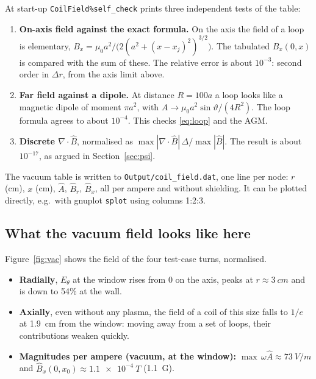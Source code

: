 \documentclass[11pt,a4paper]{article}
\newcommand{\Ahat}{\hat{A}}
\newcommand{\Bhat}{\hat{B}}
\newcommand{\code}[1]{\texttt{#1}}
\begin{document}
At start-up \code{CoilField\%self\_check} prints three independent tests of
the table:
\begin{enumerate}
  \item \textbf{On-axis field against the exact formula.} On the axis the
        field of a loop is elementary,
        $B_x = \mu_0 a^2 / \big(2(a^2+(x-x_j)^2)^{3/2}\big)$. The tabulated
        $\Bhat_x(0,x)$ is compared with the sum of these. The relative
        error is about $10^{-3}$: second order in $\Delta r$, from the axis
        limit above.
  \item \textbf{Far field against a dipole.} At distance $R = 100a$ a loop
        looks like a magnetic dipole of moment $\pi a^2$, with
        $A \to \mu_0 a^2\sin\vartheta/(4R^2)$. The loop formula agrees to
        about $10^{-4}$. This checks \eqref{eq:loop} and the AGM.
  \item \textbf{Discrete $\nabla\cdot\Bhat$}, normalised as
        $\max|\nabla\cdot\Bhat|\,\Delta/\max|\Bhat|$. The result is about
        $10^{-17}$, as argued in Section~\ref{sec:psi}.
\end{enumerate}
The vacuum table is written to \code{Output/coil\_field.dat}, one line per
node: $r$ (cm), $x$ (cm), $\Ahat$, $\Bhat_r$, $\Bhat_x$, all per ampere and
without shielding. It can be plotted directly, e.g.\ with gnuplot
\code{splot} using columns 1:2:3.

\subsection{What the vacuum field looks like here}

Figure~\ref{fig:vac} shows the field of the four test-case turns,
normalised.
\begin{itemize}
  \item \textbf{Radially}, $E_\theta$ at the window rises from 0 on the
        axis, peaks at $r\approx\SI{3}{cm}$ and is down to 54\% at the wall.
  \item \textbf{Axially}, even without any plasma, the field of a coil of
        this size falls to $1/e$ at \SI{1.9}{cm} from the window: moving
        away from a set of loops, their contributions weaken quickly.
  \item \textbf{Magnitudes per ampere (vacuum, at the window):}
        $\max\,\omega\Ahat \approx \SI{73}{V/m}$ and
        $\Bhat_x(0,x_0) \approx \SI{1.1e-4}{T}$ (\SI{1.1}{G}).
\end{itemize}
\end{document}
